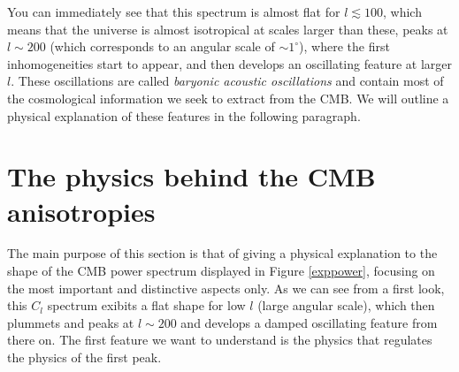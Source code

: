 You can immediately see that this spectrum is almost flat for $l\lesssim 100$, which means that the universe is almost isotropical at scales larger than these, peaks at $l\sim 200$ (which corresponds to an angular scale of $\sim 1^\circ$), where the first inhomogeneities start to appear, and then develops an oscillating feature at larger $l$. These oscillations are called \textit{baryonic acoustic oscillations} and contain most of the cosmological information we seek to extract from the CMB. We will outline a physical explanation of these features in the following paragraph. 

\section{The physics behind the CMB anisotropies}
The main purpose of this section is that of giving a physical explanation to the shape of the CMB power spectrum displayed in Figure \ref{exppower}, focusing on the most important and distinctive aspects only. As we can see from a first look, this $C_l$ spectrum exibits a flat shape for low $l$ (large angular scale), which then plummets and peaks at $l\sim 200$ and develops a damped oscillating feature from there on. The first feature we want to understand is the physics that regulates the physics of the first peak.  
